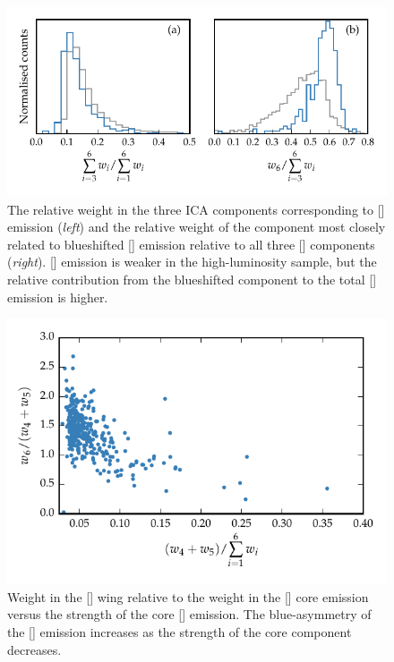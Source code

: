 \begin{figure}
    \centering
    \includegraphics[width=\textwidth]{figures/chapter04/mfica_oiii_weight.pdf} 
    \caption[{The relative weight in the three ICA components corresponding to [] emission and the relative weight of the component most closely related to blueshifted [] emission relative to all three [] components.}]{The relative weight in the three ICA components corresponding to [] emission ({\em left}) and the relative weight of the component most closely related to blueshifted [] emission relative to all three [] components ({\em right}). [] emission is weaker in the high-luminosity sample, but the relative contribution from the blueshifted component to the total [] emission is higher.}     
    \label{fig:mfica_oiii_weight}
\end{figure}

\begin{figure}
    \centering
    \includegraphics[width=\columnwidth]{figures/chapter04/oiii_core_strength_blueshift.pdf} 
    \caption[{Weight in the [] wing relative to the weight in the [] core emission versus the strength of the core [] emission.}]{Weight in the [] wing relative to the weight in the [] core emission versus the strength of the core [] emission. The blue-asymmetry of the [] emission increases as the strength of the core component decreases.}     
    \label{fig:oiii_core_strength_blueshift}
\end{figure}

